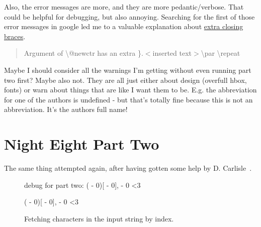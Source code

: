 \documentclass{article} \usepackage[utf8]{inputenc}
\newif\ifrunparttwotrytwo
\begin{document}
Also, the error messages are more, and they are more pedantic/verbose. That could be helpful for debugging, but also annoying.
Searching for the first of those error messages in google led me to a valuable explanation about \href{http://www.texfaq.org/FAQ-extrabrace}{extra closing braces}.~

\begin{quote}
Argument of \textbackslash @newctr has an extra \}.$<$inserted text$>$\textbackslash par \textbackslash repeat
\end{quote}

Maybe I should consider all the warnings I'm getting without even running part two first? Maybe also not. They are all just either about design (overfull hbox, fonts) or warn about things that are like I want them to be. E.g. the abbreviation for one of the authors is undefined - but that's totally fine because this is not an abbreviation. It's the authors full name!

\section{Night Eight Part Two}
The same thing attempted again, after having gotten some help by D. Carlisle~.

\ifrunparttwotrytwo

  \begin{figure}[hbp]
  debug for part two:
  \setcounter{debugctr}{-1}
	{\loop
	\edef\tmpinput{\the\numexpr \value{debugctr} - 0}
	\def\tmpchar{\expandafter\lucidcharat\tmpinput}
	(\tmpinput)[\tmpchar],
	\show\tmpchar
	\typeout{tmpchar is \tmpchar}
	\ifnum \value{debugctr}<3
	\repeat }
	
	\begin{mycode}
	
    \setcounter{debugctr}{-1}
	{\loop
		\edef\tmpinput{\the\numexpr \value{debugctr} - 0}
		\def\tmpchar{\expandafter\lucidcharat\tmpinput}
		(\tmpinput)[\tmpchar],
		\show\tmpchar
		\typeout{tmpchar is \tmpchar}
		\ifnum \value{debugctr}<3
		\repeat }
	\end{mycode}
  \caption{Fetching characters in the input string by index.}
  \label{fig:hardcodinglucidcharat}
  \end{figure}
  
\end{document}
